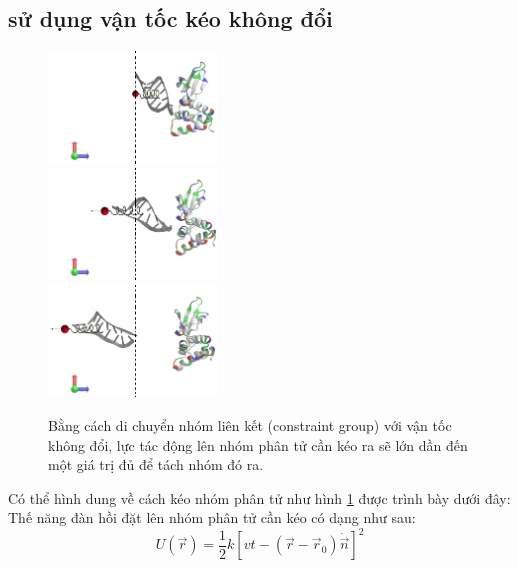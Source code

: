 \documentclass[12pt,a4paper,reqno, oneside]{book}
\begin{document}
	\subsection{ sử dụng vận tốc kéo không đổi}
	\begin{figure}
	\vspace{-30pt}
	\begin{center}
	\includegraphics[width=0.4\textwidth,natwidth=610,natheight=642]{smd-1}\\
	\includegraphics[width=0.4\textwidth,natwidth=610,natheight=642]{smd-2}\\
	\includegraphics[width=0.4\textwidth,natwidth=610,natheight=642]{smd-3}
	\end{center}
	\vspace{-5pt}
	\caption{Bằng cách di chuyển nhóm liên kết (constraint group) với vận tốc không đổi, lực tác động lên nhóm phân tử cần kéo ra sẽ lớn dần đến một giá trị đủ để tách nhóm đó ra.}
	\label{fig:smd}
	\end{figure}
	Có thể hình dung về cách kéo nhóm phân tử như hình \ref{fig:smd} được trình bày dưới đây:
	Thế năng đàn hồi đặt lên nhóm phân tử cần kéo có dạng như sau:
	\begin{equation}
	U\left(\vec{r}\right) = \dfrac{1}{2} k\left[ vt - \left( \vec{r}-\vec{r}_{0} \right) \dot\vec{n} \right]^{2}
	\end{equation}
\end{document}
